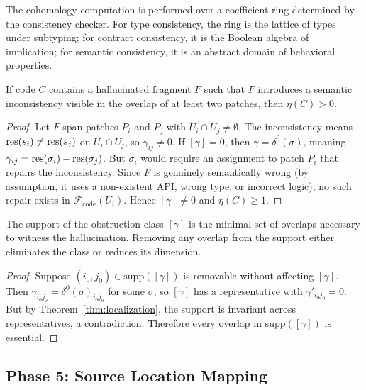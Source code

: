 \documentclass[11pt]{article}
\newcommand{\CodeSheaf}{\mathcal{F}_{\mathrm{code}}}
\newcommand{\HalluScore}{\eta}
\begin{document}
The cohomology computation is performed over a coefficient ring
determined by the consistency checker.  For type consistency, the ring
is the lattice of types under subtyping; for contract consistency,
it is the Boolean algebra of implication; for semantic consistency, it
is an abstract domain of behavioral properties.

\begin{theorem}[Completeness]\label{thm:completeness}
If code $C$ contains a hallucinated fragment $F$ such that $F$
introduces a semantic inconsistency visible in the overlap of at
least two patches, then $\HalluScore(C) > 0$.
\end{theorem}

\begin{proof}
Let $F$ span patches $P_i$ and $P_j$ with $U_i \cap U_j \neq \emptyset$.
The inconsistency means $\mathrm{res}(s_i) \neq \mathrm{res}(s_j)$ on $U_i \cap U_j$,
so $\gamma_{ij} \neq 0$.  If $[\gamma] = 0$, then $\gamma = \delta^0(\sigma)$,
meaning $\gamma_{ij} = \mathrm{res}(\sigma_i) - \mathrm{res}(\sigma_j)$.  But $\sigma_i$
would require an assignment to patch $P_i$ that repairs the inconsistency.
Since $F$ is genuinely semantically wrong (by assumption, it uses a
non-existent API, wrong type, or incorrect logic), no such repair exists
in $\CodeSheaf(U_i)$.  Hence $[\gamma] \neq 0$ and $\HalluScore(C) \geq 1$.
\end{proof}

\begin{theorem}\label{thm:minimal-support}
The support of the obstruction class $[\gamma]$ is the minimal set of
overlaps necessary to witness the hallucination.  Removing any overlap
from the support either eliminates the class or reduces its dimension.
\end{theorem}

\begin{proof}
Suppose $(i_0, j_0) \in \mathrm{supp}([\gamma])$ is removable without
affecting $[\gamma]$.  Then $\gamma_{i_0 j_0} = \delta^0(\sigma)_{i_0 j_0}$
for some $\sigma$, so $[\gamma]$ has a representative with
$\gamma'_{i_0 j_0} = 0$.  But by Theorem~\ref{thm:localization},
the support is invariant across representatives, a contradiction.
Therefore every overlap in $\mathrm{supp}([\gamma])$ is essential.
\end{proof}


\subsection{Phase 5: Source Location Mapping}
\end{document}
